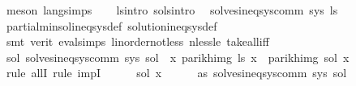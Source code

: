 \begin{isabellebody}
\ {\isacharparenleft}{\kern0pt}meson\ lang{\isachardot}{\kern0pt}simps{\isacharparenleft}{\kern0pt}{}{\isacharparenright}{\kern0pt}{\isacharparenright}{\kern0pt}\isanewline
\isanewline
\ \ \isamarkupfalse%
\ ls{\isacharprime}{\kern0pt}{\isacharunderscore}{\kern0pt}intro\ sols{\isacharunderscore}{\kern0pt}intro\ \isamarkupfalse%
\ {\isachardoublequoteopen}solves{\isacharunderscore}{\kern0pt}ineq{\isacharunderscore}{\kern0pt}sys{\isacharunderscore}{\kern0pt}comm\ sys\ {\isacharquery}{\kern0pt}ls{\isacharprime}{\kern0pt}{\isachardoublequoteclose}\isanewline
\ \ \ \ \isamarkupfalse%
\ partial{\isacharunderscore}{\kern0pt}min{\isacharunderscore}{\kern0pt}sol{\isacharunderscore}{\kern0pt}ineq{\isacharunderscore}{\kern0pt}sys{\isacharunderscore}{\kern0pt}def\ solution{\isacharunderscore}{\kern0pt}ineq{\isacharunderscore}{\kern0pt}sys{\isacharunderscore}{\kern0pt}def\isanewline
\ \ \ \ \isamarkupfalse%
\ {\isacharparenleft}{\kern0pt}smt\ {\isacharparenleft}{\kern0pt}verit{\isacharparenright}{\kern0pt}\ eval{\isachardot}{\kern0pt}simps{\isacharparenleft}{\kern0pt}{}{\isacharparenright}{\kern0pt}\ linorder{\isacharunderscore}{\kern0pt}not{\isacharunderscore}{\kern0pt}less\ nless{\isacharunderscore}{\kern0pt}le\ take{\isacharunderscore}{\kern0pt}all{\isacharunderscore}{\kern0pt}iff{\isacharparenright}{\kern0pt}\isanewline
\ \ \isamarkupfalse%
\ \isamarkupfalse%
\ {\isachardoublequoteopen}{\isasymforall}sol{\isacharprime}{\kern0pt}{\isachardot}{\kern0pt}\ solves{\isacharunderscore}{\kern0pt}ineq{\isacharunderscore}{\kern0pt}sys{\isacharunderscore}{\kern0pt}comm\ sys\ sol{\isacharprime}{\kern0pt}\ {\isasymlongrightarrow}\ {\isacharparenleft}{\kern0pt}{\isasymforall}x{\isachardot}{\kern0pt}\ parikh{\isacharunderscore}{\kern0pt}img\ {\isacharparenleft}{\kern0pt}{\isacharquery}{\kern0pt}ls{\isacharprime}{\kern0pt}\ x{\isacharparenright}{\kern0pt}\ {\isasymsubseteq}\ parikh{\isacharunderscore}{\kern0pt}img\ {\isacharparenleft}{\kern0pt}sol{\isacharprime}{\kern0pt}\ x{\isacharparenright}{\kern0pt}{\isacharparenright}{\kern0pt}{\isachardoublequoteclose}\isanewline
\ \ \isamarkupfalse%
\ {\isacharparenleft}{\kern0pt}rule\ allI{\isacharcomma}{\kern0pt}\ rule\ impI{\isacharparenright}{\kern0pt}\isanewline
\ \ \ \ \isamarkupfalse%
\ sol{\isacharprime}{\kern0pt}\ x\isanewline
\ \ \ \ \isamarkupfalse%
\ as{\isacharcolon}{\kern0pt}\ {\isachardoublequoteopen}solves{\isacharunderscore}{\kern0pt}ineq{\isacharunderscore}{\kern0pt}sys{\isacharunderscore}{\kern0pt}comm\ sys\ sol{\isacharprime}{\kern0pt}{\isachardoublequoteclose}\isanewline

\end{isabellebody}
